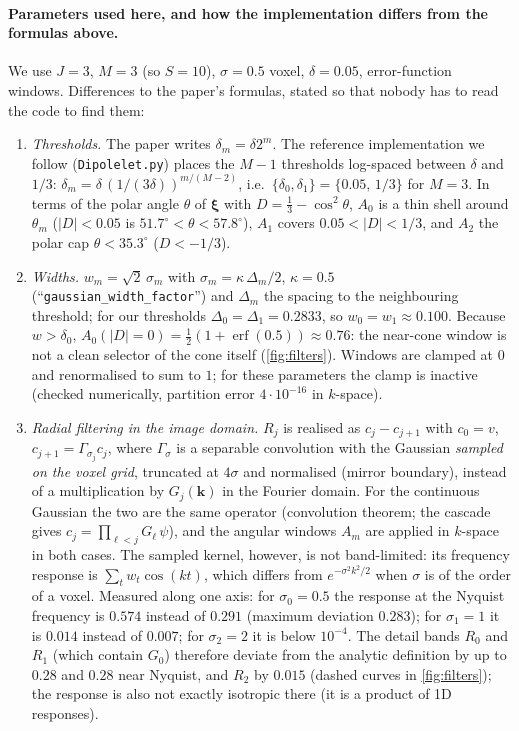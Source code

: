 \documentclass[11pt]{article}
\newcommand{\bk}{\bm{k}}
\newcommand{\bxi}{\bm{\xi}}
\newcommand{\abs}[1]{\lvert #1\rvert}
\newcommand{\code}[1]{\texttt{#1}}
\theoremstyle{remark}
\begin{document}
\paragraph{Parameters used here, and how the implementation differs from the formulas above.}
We use $J=3$, $M=3$ (so $S=10$), $\sigma=0.5$ voxel, $\delta=0.05$, error-function windows. Differences to the paper's formulas, stated so that nobody has to read the code to find them:
\begin{enumerate}[leftmargin=1.5em,itemsep=1pt]
\item \emph{Thresholds.} The paper writes $\delta_m=\delta2^m$. The reference implementation we follow (\code{Dipolelet.py}) places the $M-1$ thresholds log-spaced between $\delta$ and $1/3$:
$\delta_m=\delta\,(1/(3\delta))^{m/(M-2)}$, i.e.\ $\{\delta_0,\delta_1\}=\{0.05,\,1/3\}$ for $M=3$. In terms of the polar angle $\theta$ of $\bxi$ with $D=\tfrac13-\cos^2\theta$, $A_0$ is a thin shell around $\theta_m$
($\abs{D}<0.05$ is $51.7^\circ<\theta<57.8^\circ$), $A_1$ covers $0.05<\abs D<1/3$, and $A_2$ the polar cap $\theta<35.3^\circ$ ($D<-1/3$).
\item \emph{Widths.} $w_m=\sqrt2\,\sigma_m$ with $\sigma_m=\kappa\,\Delta_m/2$, $\kappa=0.5$ (``\code{gaussian\_width\_factor}'') and $\Delta_m$ the spacing to the neighbouring threshold; for our thresholds $\Delta_0=\Delta_1=0.2833$, so $w_0=w_1\approx0.100$.
Because $w>\delta_0$, $A_0(\abs D=0)=\tfrac12(1+\operatorname{erf}(0.5))\approx0.76$: the near-cone window is not a clean selector of the cone itself (\cref{fig:filters}).
Windows are clamped at $0$ and renormalised to sum to $1$; for these parameters the clamp is inactive (checked numerically, partition error $4\cdot10^{-16}$ in $k$-space).
\item \emph{Radial filtering in the image domain.} $R_j$ is realised as $c_j-c_{j+1}$ with $c_0=v$, $c_{j+1}=\Gamma_{\sigma_j}c_j$, where $\Gamma_\sigma$ is a separable convolution with the Gaussian \emph{sampled on the voxel grid}, truncated at $4\sigma$ and normalised (mirror boundary), instead of a multiplication by $G_j(\bk)$ in the Fourier domain.
For the continuous Gaussian the two are the same operator (convolution theorem; the cascade gives $c_j=\prod_{\ell<j}G_\ell\,\psi$), and the angular windows $A_m$ are applied in $k$-space in both cases. The sampled kernel, however, is not band-limited: its frequency response is $\sum_tw_t\cos(kt)$, which differs from $e^{-\sigma^2k^2/2}$ when $\sigma$ is of the order of a voxel.
Measured along one axis: for $\sigma_0=0.5$ the response at the Nyquist frequency is $0.574$ instead of $0.291$ (maximum deviation $0.283$); for $\sigma_1=1$ it is $0.014$ instead of $0.007$; for $\sigma_2=2$ it is below $10^{-4}$. The detail bands $R_0$ and $R_1$ (which contain $G_0$) therefore deviate from the analytic definition by up to $0.28$ and $0.28$ near Nyquist, and $R_2$ by $0.015$ (dashed curves in \cref{fig:filters}); the response is also not exactly isotropic there (it is a product of 1D responses).

\end{enumerate}
\end{document}
